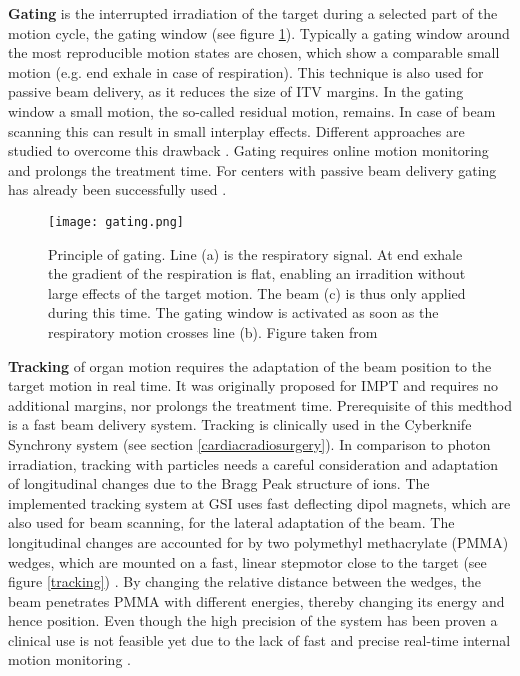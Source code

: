 \documentclass[type=dr, dr=rernat, accentcolor=tud7b,colorbacktitle, bigchapter, openright, twoside, 12pt ]{tudthesis}
\begin{document}

\textbf{Gating} is the interrupted irradiation of the target during a selected part of the motion cycle, the gating window \cite{Min00} 
\cite{Li06} (see figure \ref{gating}). Typically a gating window around the most reproducible motion states are chosen, which show a comparable 
small motion (e.g. end exhale in case of respiration). This technique is also used for passive beam delivery, as it reduces the size 
of ITV margins. In the gating window a small motion, the so-called residual motion, remains. In case of beam scanning this can result in 
small interplay effects. Different approaches are studied to overcome this drawback \cite{Fur07} \cite{Zen10} \cite{Ber09}. Gating requires 
online motion monitoring and prolongs the treatment time. For centers with passive beam delivery gating has already been successfully 
used \cite{Min00} \cite{Iwa10} \cite{Has06}.\newpage

\begin{figure}[H]
\begin{center}
\texttt{[image: gating.png]}
\caption{Principle of gating. Line (a) is the respiratory signal. At end exhale the gradient of the respiration is flat, enabling an 
irradition without large effects of the target motion. The beam (c) is thus only applied during this time. The gating window is activated 
as soon as the respiratory motion crosses line (b). Figure taken from \cite{Min00}}
\label{gating}
\end{center}
\end{figure}


\textbf{Tracking} of organ motion requires the adaptation of the beam position to the target motion in real time. It was originally proposed 
for IMPT \cite{Kae01} and requires no additional margins, nor prolongs the treatment time. Prerequisite of this medthod is a fast beam 
delivery system. Tracking is clinically used in the Cyberknife Synchrony system (see section \ref{cardiacradiosurgery}). 
In comparison to photon irradiation, tracking with particles needs a careful consideration and adaptation of longitudinal changes due to 
the Bragg Peak structure of ions. The implemented tracking system at GSI \cite{Gro04} uses fast deflecting dipol magnets, which 
are also used for beam scanning, for the lateral adaptation of the beam. The longitudinal changes are accounted for by two polymethyl 
methacrylate (PMMA) wedges, which are mounted on a fast, linear stepmotor close to the target (see figure \ref{tracking}) \cite{Sai09}. By 
changing the relative distance between the wedges, the beam penetrates PMMA with different energies, thereby changing its energy and 
hence position. Even though the high precision of the system has been proven \cite{Ber07} \cite{Ber10} \cite{Sai09} a clinical use 
is not feasible yet due to the lack of fast and precise real-time internal motion monitoring \cite{Ric12}.\newpage
\end{document}
